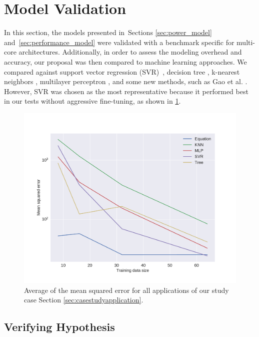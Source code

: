 \section{Model Validation} \label{sec:model_validation}
In this section, the models presented in~Sections \ref{sec:power_model} and~\ref{sec:performance_model} were validated with a benchmark specific for multi-core architectures. Additionally, in order to assess the modeling overhead and accuracy, our proposal was then compared to machine learning approaches. We compared against support vector regression (SVR)~\cite{Smola2004ARegression}, decision tree \cite{Kitts2006RegressionLecture}, k-nearest neighbors \cite{Altman1992AnRegression}, multilayer perceptron \cite{Murtagh1991MultilayerRegression}, and some new methods, such as Gao et al. \cite{Gao2019DendriticPrediction}. However, SVR was chosen as the most representative because it performed best in our tests without aggressive fine-tuning, as shown in \cref{fig:ml_models}.

\begin{figure}[H]
	\centering
	\includegraphics[width=\columnwidth]{experiments/figures/ml_models.pdf}
	\caption{Average of the mean squared error for all applications of our study case Section \ref{sec:casestudyapplication}.}
	\label{fig:ml_models}
\end{figure}

\subsection{Verifying Hypothesis} \label{subsec:ev_verifying_hypothesis}

